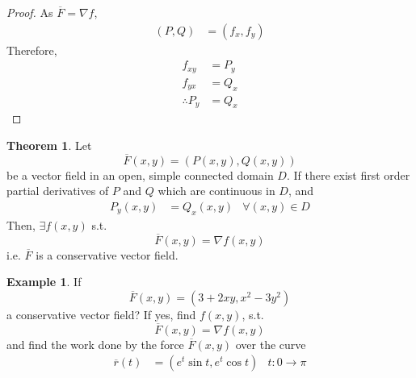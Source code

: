 \documentclass[fleqn, a4paper, 12pt]{article}
\theoremstyle{definition}
\newtheorem{example}{Example}
\theoremstyle{theorem}
\newtheorem{theorem}{Theorem}
\theoremstyle{remark}
\begin{document}
\begin{proof}
	As $\overline{F} = \nabla f$, 
	\begin{align*}
		(P, Q) &= (f_x, f_y)
	\end{align*}
	Therefore,
	\begin{align*}
		f_{xy} &= P_y\\
		f_{yx} &= Q_x\\
		\therefore P_y &= Q_x
	\end{align*}
\end{proof}

\begin{theorem}
	Let
	\begin{equation*}
		\overline{F}(x,y) = \left( P(x,y), Q(x,y) \right)
	\end{equation*}
	be a vector field in an open, simple connected domain $D$. If there exist first order partial derivatives of $P$ and $Q$ which are continuous in $D$, and
	\begin{align*}
		P_y(x,y) &= Q_x(x,y) &\forall (x,y) \in D
	\end{align*}
	Then, $\exists f(x,y)$ s.t.
	\begin{equation*}
		\overline{F}(x,y) = \nabla f(x,y)
	\end{equation*}
	i.e. $\overline{F}$ is a conservative vector field.
\end{theorem}

\begin{example}
	If 
	\begin{equation*}
		\overline{F}(x,y) = (3 + 2 x y, x^2 - 3 y^2)
	\end{equation*}
	a conservative vector field? If yes, find $f(x,y)$, s.t.
	\begin{equation*}
		\overline{F}(x,y) = \nabla f(x,y)
	\end{equation*}
	and find the work done by the force $\overline{F}(x,y)$ over the curve
	\begin{align*}
		\overline{r}(t) &= (e^t \sin t, e^t \cos t) & t : 0 \to \pi
	\end{align*}
\end{example}
\end{document}
